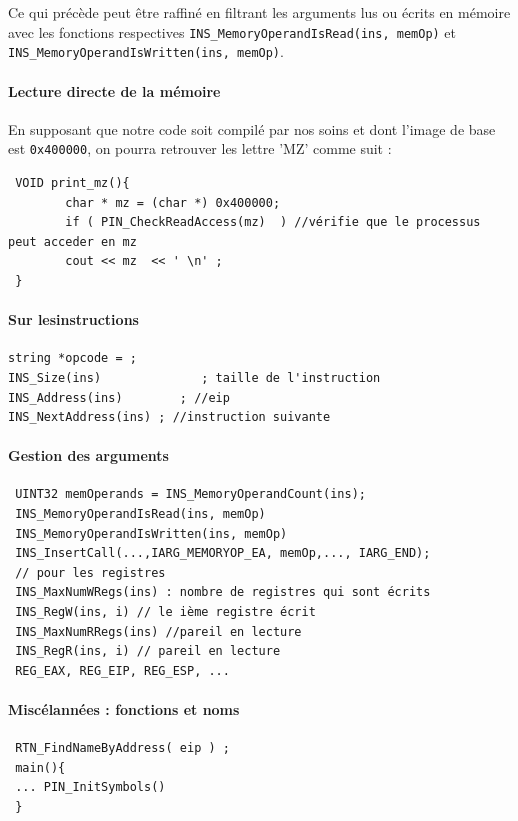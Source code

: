 \documentclass{book}
\newcommand{\code}[1]{\texttt{#1}}
\begin{document}
 Ce qui précède peut être raffiné en filtrant les arguments lus ou écrits en mémoire avec les fonctions respectives  \code{INS\_MemoryOperandIsRead(ins, memOp)} et    \code{INS\_MemoryOperandIsWritten(ins, memOp)}. 
 
 \paragraph{Lecture directe de la mémoire}

En supposant que notre code soit compilé par nos soins et dont l'image de base est \code{0x400000}, on pourra retrouver les lettre 'MZ' comme suit : 


\begin{verbatim}
 VOID print_mz(){
        char * mz = (char *) 0x400000;
        if ( PIN_CheckReadAccess(mz)  ) //vérifie que le processus peut acceder en mz
	  	cout << mz  << ' \n' ; 
 }
\end{verbatim}	
 
\paragraph{Sur les{instructions}}
\begin{verbatim}
string *opcode = ;
INS_Size(ins)              ; taille de l'instruction
INS_Address(ins)        ; //eip
INS_NextAddress(ins) ; //instruction suivante
\end{verbatim}	

\paragraph{Gestion des arguments}
 \begin{verbatim}
 UINT32 memOperands = INS_MemoryOperandCount(ins);
 INS_MemoryOperandIsRead(ins, memOp)
 INS_MemoryOperandIsWritten(ins, memOp)
 INS_InsertCall(...,IARG_MEMORYOP_EA, memOp,..., IARG_END);
 // pour les registres
 INS_MaxNumWRegs(ins) : nombre de registres qui sont écrits
 INS_RegW(ins, i) // le ième registre écrit
 INS_MaxNumRRegs(ins) //pareil en lecture
 INS_RegR(ins, i) // pareil en lecture
 REG_EAX, REG_EIP, REG_ESP, ...
 \end{verbatim}
 
 
 \paragraph{Miscélannées : fonctions et noms}
 \begin{verbatim}
 RTN_FindNameByAddress( eip ) ;
 main(){
 ... PIN_InitSymbols()
 }
 \end{verbatim}
 
\end{document}

